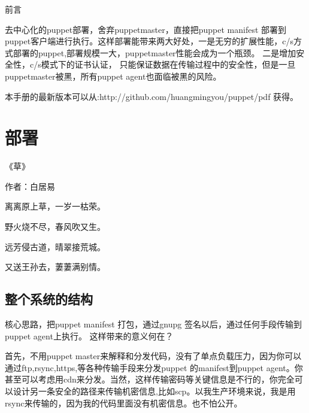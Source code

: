 \newpage
\begin{center}
\kai 前言
\end{center}
\fzsk
\par
去中心化的puppet部署，舍弃puppetmaster，直接把puppet manifest 部署到puppet客户端进行执行。这样部署能带来两大好处，一是无穷的扩展性能，c/s方式部署的puppet,部署规模一大，puppetmaster性能会成为一个瓶颈。 二是增加安全性，c/s模式下的证书认证，
只能保证数据在传输过程中的安全性，但是一旦puppetmaster被黑，所有puppet agent也面临被黑的风险。\par
本手册的最新版本可以从:http://github.com/huangmingyou/puppet/pdf 获得。
\song
\newpage
\chapter{\msyh 部署}
\begin{center}
\kai\small

《草》\par
作者：白居易 \par
离离原上草，一岁一枯荣。 \par
野火烧不尽，春风吹又生。 \par
远芳侵古道，晴翠接荒城。 \par
又送王孙去，萋萋满别情。 \par
\end{center}



\section{\msyh \small 整个系统的结构}
\fzsk 

核心思路，把puppet manifest 打包，通过gnupg 签名以后，通过任何手段传输到 puppet agent上执行。 这样带来的意义何在？ 
\par
首先，不用puppet master来解释和分发代码，没有了单点负载压力，因为你可以通过ftp,rsync,https,等各种传输手段来分发puppet 的manifest到puppet agent。你甚至可以考虑用cdn来分发。当然，这样传输密码等关键信息是不行的，你完全可以设计另一条安全的路径来传输机密信息,比如scp。以我生产环境来说，我是用rsync来传输的，因为我的代码里面没有机密信息。也不怕公开。

